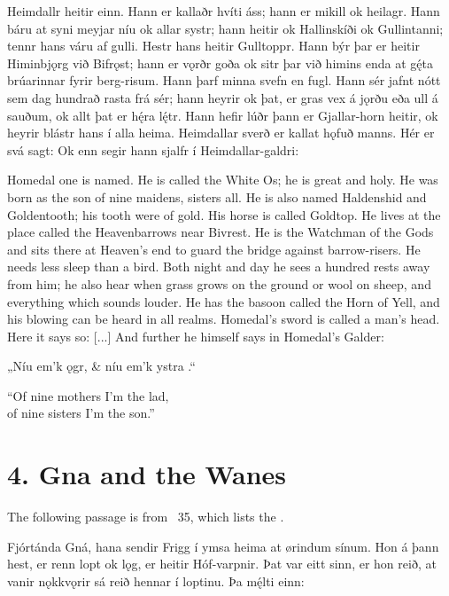 \bpg\bpa%
Heimdallr heitir einn. Hann er kallaðr hvíti áss; hann er mikill ok heilagr. Hann báru at syni meyjar níu ok allar systr; hann heitir ok Hallinskíði ok Gullintanni; tennr hans váru af gulli. Hestr hans heitir Gulltoppr. Hann býr þar er heitir Himinbjǫrg við Bifrǫst; hann er vǫrðr goða ok sitr þar við himins enda at gę́ta brúarinnar fyrir berg-risum. Hann þarf minna svefn en fugl. Hann sér jafnt nótt sem dag hundrað rasta frá sér; hann heyrir ok þat, er gras vex á jǫrðu eða ull á sauðum, ok allt þat er hę́ra lę́tr. Hann hefir lúðr þann er Gjallar-horn heitir, ok heyrir blástr hans í alla heima. Heimdallar sverð er kallat hǫfuð manns. Hér er svá sagt:  Ok enn segir hann sjalfr í Heimdallar-galdri:\epa

\bpb Homedal one is named.  He is called the White Os; he is great and holy.  He was born as the son of nine maidens, sisters all.  He is also named Haldenshid and Goldentooth; his tooth were of gold.  His horse is called Goldtop.  He lives at the place called the Heavenbarrows near Bivrest.  He is the Watchman of the Gods and sits there at Heaven’s end to guard the bridge against barrow-risers.  He needs less sleep than a bird.  Both night and day he sees a hundred rests away from him; he also hear when grass grows on the ground or wool on sheep, and everything which sounds louder. He has the basoon called the Horn of Yell, and his blowing can be heard in all realms.  Homedal’s sword is called a man’s head.  Here it says so: [...] And further he himself says in Homedal’s Galder:\epb\epg


\bvg\bva%
„Níu em’k  ǫgr, &
níu em’k ystra .“\eva

\bvb “Of nine mothers I’m the lad, \\
of nine sisters I’m the son.”\evb\evg

\sectionline

\section{4. Gna and the Wanes}\chapterStart

The following passage is from \Gylfaginning\ 35, which lists the .

\bpg\bpa%
Fjórtánda Gná, hana sendir Frigg í ymsa heima at ørindum sínum. Hon á þann hest, er renn lopt ok lǫg, er heitir Hóf-varpnir. Þat var eitt sinn, er hon reið, at vanir nǫkkvǫrir sá reið hennar í loptinu. Þa mę́lti einn:\epa

